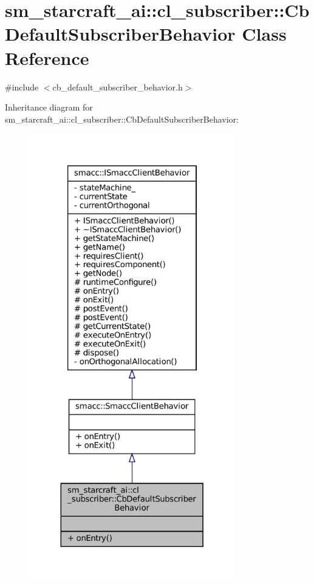 \hypertarget{classsm__starcraft__ai_1_1cl__subscriber_1_1CbDefaultSubscriberBehavior}{}\section{sm\+\_\+starcraft\+\_\+ai\+:\+:cl\+\_\+subscriber\+:\+:Cb\+Default\+Subscriber\+Behavior Class Reference}
\label{classsm__starcraft__ai_1_1cl__subscriber_1_1CbDefaultSubscriberBehavior}


{\ttfamily \#include $<$cb\+\_\+default\+\_\+subscriber\+\_\+behavior.\+h$>$}



Inheritance diagram for sm\+\_\+starcraft\+\_\+ai\+:\+:cl\+\_\+subscriber\+:\+:Cb\+Default\+Subscriber\+Behavior\+:
\nopagebreak
\begin{figure}[H]
\begin{center}
\leavevmode
\includegraphics[height=550pt]{classsm__starcraft__ai_1_1cl__subscriber_1_1CbDefaultSubscriberBehavior__inherit__graph}
\end{center}
\end{figure}


